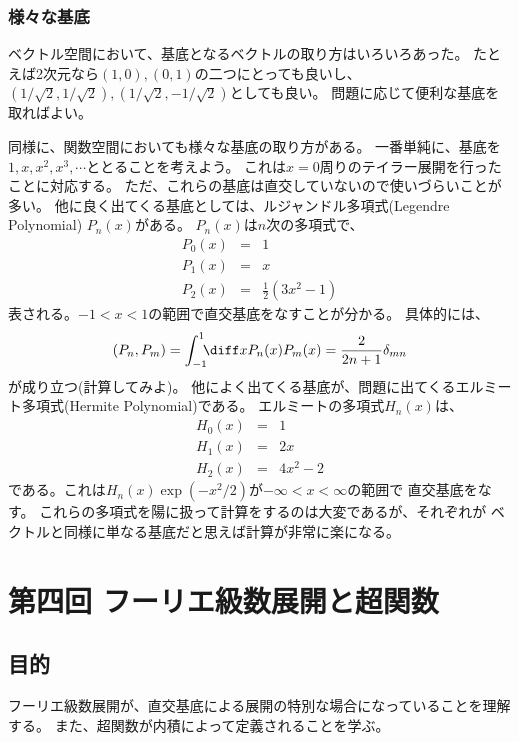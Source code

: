 \subsubsection{様々な基底}

ベクトル空間において、基底となるベクトルの取り方はいろいろあった。
たとえば2次元なら$(1,0),(0,1)$の二つにとっても良いし、
$(1/\sqrt{2},1/\sqrt{2}),(1/\sqrt{2},-1/\sqrt{2})$としても良い。
問題に応じて便利な基底を取ればよい。

同様に、関数空間においても様々な基底の取り方がある。
一番単純に、基底を$1,x,x^2,x^3,\cdots$ととることを考えよう。
これは$x=0$周りのテイラー展開を行ったことに対応する。
ただ、これらの基底は直交していないので使いづらいことが多い。
他に良く出てくる基底としては、ルジャンドル多項式(Legendre Polynomial) $P_n(x)$がある。
$P_n(x)$は$n$次の多項式で、
\begin{eqnarray*}
  P_0(x) &=& 1\\
  P_1(x) &=& x\\
  P_2(x) &=& \frac{1}{2}(3x^2-1)
\end{eqnarray*}
表される。$-1 < x < 1$の範囲で直交基底をなすことが分かる。
具体的には、
\begin{equation}
  (P_n,P_m) = \int_{-1}^{1} \!\!\!\diff x P_n(x) P_m(x)= \frac{2}{2n+1} \delta_{mn}
\end{equation}
が成り立つ(計算してみよ)。
他によく出てくる基底が、問題に出てくるエルミート多項式(Hermite Polynomial)である。
エルミートの多項式$H_n(x)$は、
\begin{eqnarray*}
  H_0(x) &=& 1\\
  H_1(x) &=& 2x\\
  H_2(x) &=& 4x^2-2
\end{eqnarray*}
である。これは$H_n(x) \exp(-x^2/2)$が$-\infty < x < \infty$の範囲で
直交基底をなす。
これらの多項式を陽に扱って計算をするのは大変であるが、それぞれが
ベクトルと同様に単なる基底だと思えば計算が非常に楽になる。


\newpage
\section{第四回 フーリエ級数展開と超関数}

\subsection{目的}
フーリエ級数展開が、直交基底による展開の特別な場合になっていることを理解する。
また、超関数が内積によって定義されることを学ぶ。

